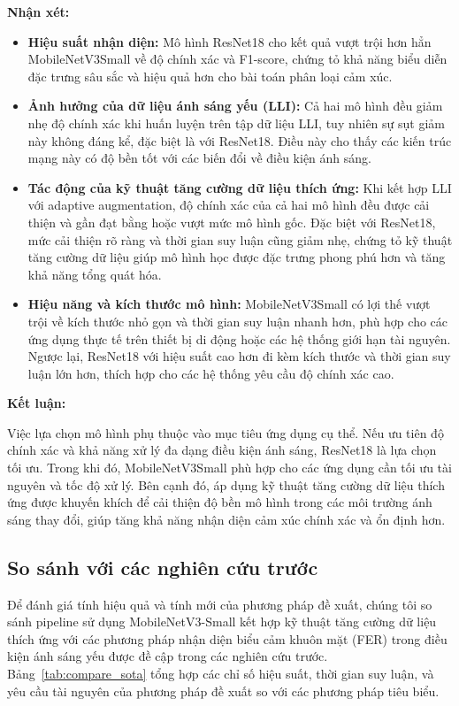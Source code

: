 \textbf{Nhận xét:}

\begin{itemize}
    \item \textbf{Hiệu suất nhận diện:} Mô hình ResNet18 cho kết quả vượt trội hơn hẳn MobileNetV3Small về độ chính xác và F1-score, chứng tỏ khả năng biểu diễn đặc trưng sâu sắc và hiệu quả hơn cho bài toán phân loại cảm xúc.
    
    \item \textbf{Ảnh hưởng của dữ liệu ánh sáng yếu (LLI):} Cả hai mô hình đều giảm nhẹ độ chính xác khi huấn luyện trên tập dữ liệu LLI, tuy nhiên sự sụt giảm này không đáng kể, đặc biệt là với ResNet18. Điều này cho thấy các kiến trúc mạng này có độ bền tốt với các biến đổi về điều kiện ánh sáng.
    
    \item \textbf{Tác động của kỹ thuật tăng cường dữ liệu thích ứng:} Khi kết hợp LLI với adaptive augmentation, độ chính xác của cả hai mô hình đều được cải thiện và gần đạt bằng hoặc vượt mức mô hình gốc. Đặc biệt với ResNet18, mức cải thiện rõ ràng và thời gian suy luận cũng giảm nhẹ, chứng tỏ kỹ thuật tăng cường dữ liệu giúp mô hình học được đặc trưng phong phú hơn và tăng khả năng tổng quát hóa.
    
    \item \textbf{Hiệu năng và kích thước mô hình:} MobileNetV3Small có lợi thế vượt trội về kích thước nhỏ gọn và thời gian suy luận nhanh hơn, phù hợp cho các ứng dụng thực tế trên thiết bị di động hoặc các hệ thống giới hạn tài nguyên. Ngược lại, ResNet18 với hiệu suất cao hơn đi kèm kích thước và thời gian suy luận lớn hơn, thích hợp cho các hệ thống yêu cầu độ chính xác cao.
\end{itemize}

\textbf{Kết luận:} 

Việc lựa chọn mô hình phụ thuộc vào mục tiêu ứng dụng cụ thể. Nếu ưu tiên độ chính xác và khả năng xử lý đa dạng điều kiện ánh sáng, ResNet18 là lựa chọn tối ưu. Trong khi đó, MobileNetV3Small phù hợp cho các ứng dụng cần tối ưu tài nguyên và tốc độ xử lý. Bên cạnh đó, áp dụng kỹ thuật tăng cường dữ liệu thích ứng được khuyến khích để cải thiện độ bền mô hình trong các môi trường ánh sáng thay đổi, giúp tăng khả năng nhận diện cảm xúc chính xác và ổn định hơn.

\subsection{So sánh với các nghiên cứu trước}
Để đánh giá tính hiệu quả và tính mới của phương pháp đề xuất, chúng tôi so sánh pipeline sử dụng MobileNetV3-Small kết hợp kỹ thuật tăng cường dữ liệu thích ứng với các phương pháp nhận diện biểu cảm khuôn mặt (FER) trong điều kiện ánh sáng yếu được đề cập trong các nghiên cứu trước. Bảng~\ref{tab:compare_sota} tổng hợp các chỉ số hiệu suất, thời gian suy luận, và yêu cầu tài nguyên của phương pháp đề xuất so với các phương pháp tiêu biểu.


